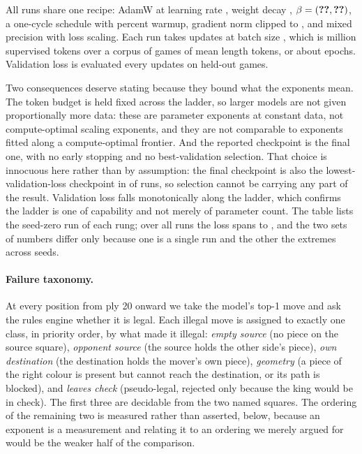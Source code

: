 \documentclass[11pt]{article}
\begin{document}
All  runs share one recipe: AdamW at learning rate , weight decay
, $\beta = (\result{trnBetaOne}, \result{trnBetaTwo})$, a one-cycle schedule with
 percent warmup, gradient norm clipped to , and mixed precision with
loss scaling. Each run takes
 updates at batch size , which is  million supervised tokens
over a corpus of  games of mean length  tokens, or about
 epochs. Validation loss is evaluated every  updates on held-out games.

Two consequences deserve stating because they bound what the exponents mean. The
token budget is held fixed across the ladder, so larger models are not given
proportionally more data: these are parameter exponents at constant data, not
compute-optimal scaling exponents, and they are not comparable to exponents fitted
along a compute-optimal frontier. And the reported checkpoint is the final one, with
no early stopping and no best-validation selection. That choice is innocuous here
rather than by assumption: the final checkpoint is also the lowest-validation-loss
checkpoint in  of  runs, so selection cannot be carrying any part of
the result. Validation loss falls monotonically along the ladder, which confirms the
ladder is one of capability and not merely of parameter count. The table lists the
seed-zero run of each rung; over all  runs the loss spans  to
, and the two sets of numbers differ only because one is a single run and
the other the extremes across seeds.

\paragraph{Failure taxonomy.}
At every position from ply 20 onward we take the model's top-1 move and ask the
rules engine whether it is legal. Each illegal move is assigned to exactly one
class, in priority order, by what made it illegal:
\emph{empty source} (no piece on the source square),
\emph{opponent source} (the source holds the other side's piece),
\emph{own destination} (the destination holds the mover's own piece),
\emph{geometry} (a piece of the right colour is present but cannot reach the
destination, or its path is blocked), and
\emph{leaves check} (pseudo-legal, rejected only because the king would be in
check). The first three are decidable from the two named squares. The ordering
of the remaining two is measured rather than asserted, below, because an exponent
is a measurement and relating it to an ordering we merely argued for would be the
weaker half of the comparison.
\end{document}
